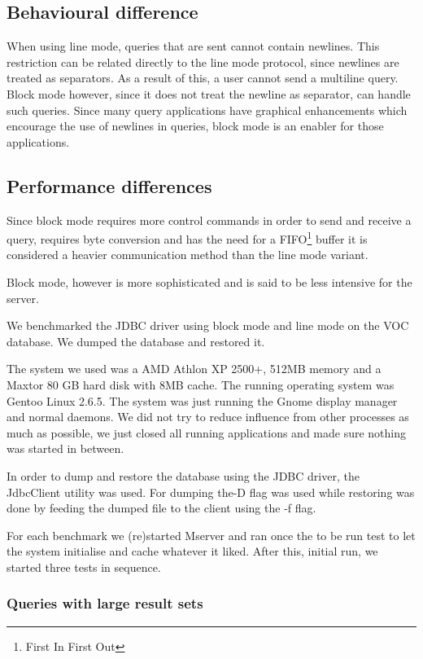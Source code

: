 \documentclass{article}
\begin{document}
\subsection{Behavioural difference}

When using line mode, queries that are sent cannot contain newlines.
This restriction can be related directly to the line mode protocol, since
newlines are treated as separators. As a result of this, a user cannot
send a multiline query. Block mode however, since it does not treat
the newline as separator, can handle such queries. Since many
query applications have graphical enhancements which encourage
the use of newlines in queries, block mode is an enabler for those
applications.


\subsection{Performance differences}

Since block mode requires more control commands in order to send and
receive a query, requires byte conversion and has the need for a
FIFO\footnote{First In First Out} buffer it is considered a heavier
communication method than the line mode variant.

Block mode, however is more sophisticated and is said to be less
intensive for the server.

We benchmarked the JDBC driver using block mode and line mode on
the VOC database. We dumped the database and restored it.

The system we used was a AMD Athlon XP 2500+, 512MB memory
and a Maxtor 80 GB hard disk with 8MB cache. The running operating
system was Gentoo Linux 2.6.5. The system was just running the
Gnome display manager and normal daemons. We did not try to
reduce influence from other processes as much as possible, we just
closed all running applications and made sure nothing was started
in between.

In order to dump and restore the database using the JDBC driver, the
\textsf{JdbcClient} utility was used. For dumping the\textsf{-D} flag
was used while restoring was done by feeding the dumped file to the
client using the \textsf{-f} flag.

For each benchmark we (re)started Mserver and ran once the to be
run test to let the system initialise and cache whatever it liked.
After this, initial run, we started three tests in sequence.


\subsubsection{Queries with large result sets}
\end{document}
